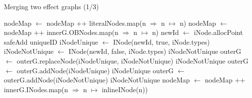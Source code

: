 \documentclass[a4paper]{article}
\begin{document}
\begin{algorithm}
\caption{Merging two effect graphs (1/3)}\label{algo:pt:mergegraphs}
\begin{algorithmic}[1]
    \State nodeMap $\gets$ nodeMap ++ literalNodes.map(n $\Rightarrow$ n $\mapsto$ n)
    \State nodeMap $\gets$ nodeMap ++ innerG.OBNodes.map(n $\Rightarrow$ n $\mapsto$ n)
    \State
        \State newId $\gets$ iNode.allocPoint safeAdd uniqueID
        \State
        \State iNodeUnique    $\gets$ INode(newId, true, iNode.types)
        \State iNodeNotUnique $\gets$ INode(newId, false, iNode.types)
            \State \Return iNodeNotUnique
            \State outerG $\gets$ outerG.replaceNode(iNodeUnique, iNodeNotUnique)
            \State \Return iNodeNotUnique
            \State outerG $\gets$ outerG.addNode(iNodeUnique)
            \State \Return iNodeUnique
        \Else
            \State outerG $\gets$ outerG.addNode(iNodeNotUnique)
            \State \Return iNodeNotUnique
        \EndIf
    \EndFunction
    \State
    \State nodeMap $\gets$ nodeMap ++ innerG.INodes.map(n $\Rightarrow$ n $\mapsto$ inlineINode(n))
\end{algorithmic}
\end{algorithm}
\end{document}
